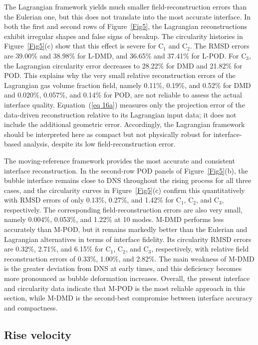 \documentclass[a4paper,fleqn]{cas-sc}
\begin{document}
	The Lagrangian framework yields much smaller field-reconstruction errors than the Eulerian one, but this does not translate into the most accurate interface. In both the first and second rows of Figure~\ref{Fig5}, the Lagrangian reconstructions exhibit irregular shapes and false signs of breakup. The circularity histories in Figure~\ref{Fig5}(c) show that this effect is severe for C$_1$ and C$_2$. The RMSD errors are 39.00\% and 38.98\% for L-DMD, and 36.65\% and 37.41\% for L-POD. For C$_3$, the Lagrangian circularity error decreases to 28.22\% for DMD and 21.82\% for POD. This explains why the very small relative reconstruction errors of the Lagrangian gas volume fraction field, namely 0.11\%, 0.19\%, and 0.52\% for DMD and 0.020\%, 0.057\%, and 0.14\% for POD, are not reliable to assess the actual interface quality. Equation~(\ref{eq 16a}) measures only the projection error of the data-driven reconstruction relative to its Lagrangian input data; it does not include the additional geometric error. Accordingly, the Lagrangian framework should be interpreted here as compact but not physically robust for interface-based analysis, despite its low field-reconstruction error.
	
	The moving-reference framework provides the most accurate and consistent interface reconstruction. In the second-row POD panels of Figure~\ref{Fig5}(b), the bubble interface remains close to DNS throughout the rising process for all three cases, and the circularity curves in Figure~\ref{Fig5}(c) confirm this quantitatively with RMSD errors of only 0.13\%, 0.27\%, and 1.42\% for C$_1$, C$_2$, and C$_3$, respectively. The corresponding field-reconstruction errors are also very small, namely 0.004\%, 0.053\%, and 1.22\% at 10 modes. M-DMD performs less accurately than M-POD, but it remains markedly better than the Eulerian and Lagrangian alternatives in terms of interface fidelity. Its circularity RMSD errors are 0.32\%, 2.71\%, and 6.15\% for C$_1$, C$_2$, and C$_3$, respectively, with relative field reconstruction errors of 0.33\%, 1.00\%, and 2.82\%. The main weakness of M-DMD is the greater deviation from DNS at early times, and this deficiency becomes more pronounced as bubble deformation increases. Overall, the present interface and circularity data indicate that M-POD is the most reliable approach in this section, while M-DMD is the second-best compromise between interface accuracy and compactness.
	
	\subsection{Rise velocity}
	\label{Rise velocity}
	
\end{document}
